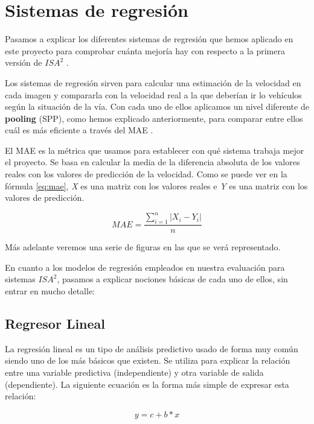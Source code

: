 \section{Sistemas de regresión}

Pasamos a explicar los diferentes sistemas de regresión que hemos aplicado en este proyecto para comprobar cuánta mejoría hay con respecto a la primera versión de $ISA^{2}$ \cite{isa2}.

Los sistemas de regresión sirven para calcular una estimación de la velocidad en cada imagen y compararla con la velocidad real a la que deberían ir lo vehículos según la situación de la vía. Con cada uno de ellos aplicamos un nivel diferente de \textbf{pooling} (\ac{SPP}), como hemos explicado anteriormente, para comparar entre ellos cuál es más eficiente a través del \ac{MAE} \cite{mae}.
 
El \ac{MAE} es la métrica que usamos para establecer con qué sistema trabaja mejor el proyecto. Se basa en calcular la media de la diferencia absoluta de los valores reales con los valores de predicción de la velocidad. Como se puede ver en la fórmula \ref{eq:mae}, \textit{X} es una matriz con los valores reales e \textit{Y} es una matriz con los valores de predicción.

\begin{equation}\label{eq:mae}
MAE = \frac{\sum_{i=1}^{n}|X_i - Y_i|}{n}
\end{equation}

Más adelante veremos una serie de figuras en las que se verá representado.


En cuanto a los modelos de regresión empleados en nuestra evaluación para sistemas $ISA^2$, pasamos a explicar nociones básicas de cada uno de ellos, sin entrar en mucho detalle:
\subsection{Regresor Lineal}

La regresión lineal \cite{linear} es un tipo de análisis predictivo usado de forma muy común siendo uno de los más básicos que existen. Se utiliza para explicar la relación entre una variable predictiva (independiente) y otra variable de salida (dependiente). La siguiente ecuación es la forma más simple de expresar esta relación:

\begin{equation}
y = c + b*x
\end{equation}

